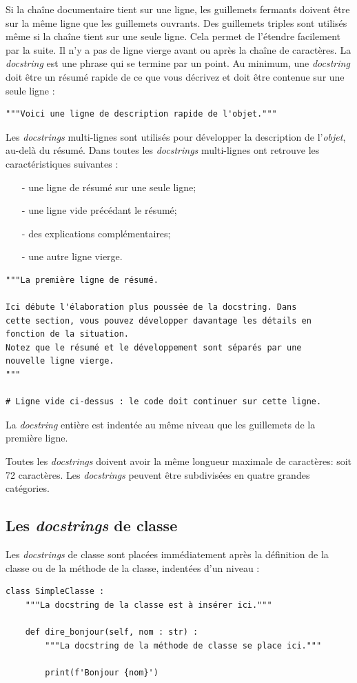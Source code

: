 \documentclass[a4paper,12pt]{book}
\begin{document}
Si la chaîne documentaire tient sur une ligne, les guillemets fermants doivent être sur la même ligne que les guillemets ouvrants. Des guillemets triples sont utilisés même si la chaîne tient sur une seule ligne. Cela permet de l'étendre facilement par la suite. Il n'y a pas de ligne vierge avant ou après la chaîne de caractères. La \textit{docstring} est une phrase qui se termine par un point. Au minimum, une \textit{docstring} doit être un résumé rapide de ce que vous décrivez et doit être contenue sur une seule ligne :
\begin{lstlisting}
"""Voici une ligne de description rapide de l'objet."""
\end{lstlisting}
\medskip

Les \textit{docstrings} multi-lignes sont utilisés pour développer la description de l'\textit{objet}, au-delà du résumé. Dans toutes les \textit{docstrings} multi-lignes ont retrouve les caractéristiques suivantes :
\begin{itemize}
    \item[-] une ligne de résumé sur une seule ligne;
    \item[-] une ligne vide précédant le résumé;
    \item[-] des explications complémentaires;
    \item[-] une autre ligne vierge.
\end{itemize}
\medskip

\begin{lstlisting}
"""La première ligne de résumé.

Ici débute l'élaboration plus poussée de la docstring. Dans 
cette section, vous pouvez développer davantage les détails en 
fonction de la situation.
Notez que le résumé et le développement sont séparés par une 
nouvelle ligne vierge.
"""

# Ligne vide ci-dessus : le code doit continuer sur cette ligne.
\end{lstlisting}
\medskip

La \textit{docstring} entière est indentée au même niveau que les guillemets de la première ligne.
\medskip

Toutes les \textit{docstrings} doivent avoir la même longueur maximale de caractères: soit 72 caractères. Les \textit{docstrings} peuvent être subdivisées en quatre grandes catégories.
\medskip

\subsection*{Les \textit{docstrings} de classe}
Les \textit{docstrings} de classe sont placées immédiatement après la définition de la classe ou de la méthode de la classe, indentées d'un niveau :
\begin{lstlisting}
class SimpleClasse :
    """La docstring de la classe est à insérer ici."""

    def dire_bonjour(self, nom : str) :
        """La docstring de la méthode de classe se place ici."""

        print(f'Bonjour {nom}')
\end{lstlisting}
\medskip
\end{document}
